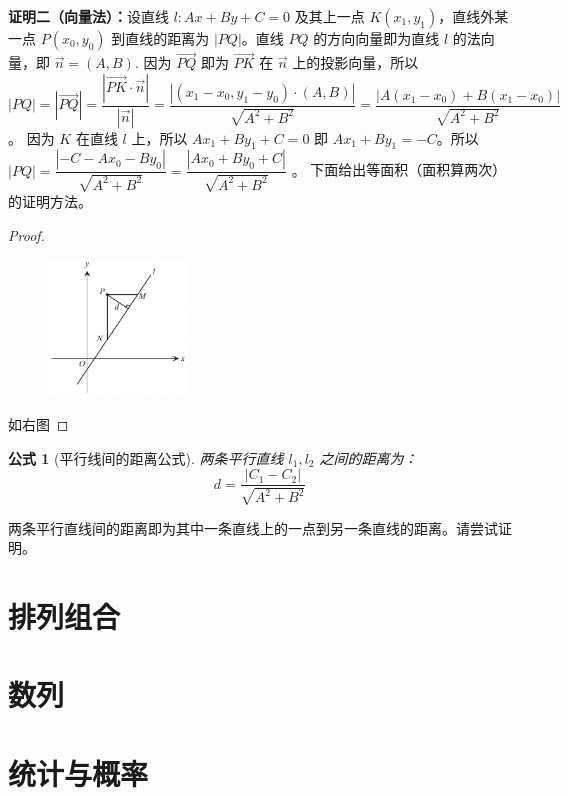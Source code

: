 \documentclass[a4paper,openany]{ctexbook}
\newtheorem{formula}{公式}
\renewcommand{\vec}{\overrightarrow}
\begin{document}
{    \textbf{证明二（向量法）：}设直线 \(l:Ax + By + C = 0\) 及其上一点 \(K(x_1,y_1)\)，直线外某一点 \(P(x_0,y_0)\) 到直线的距离为 \(|PQ|\)。直线 \(PQ\) 的方向向量即为直线 \(l\) 的法向量，即 \(\vec{n} =(A,B)\).
    因为 \(\vec{PQ}\) 即为 \(\vec{PK}\) 在 \(\vec{n}\) 上的投影向量，所以
    \(|PQ|=|\vec{PQ}|= \dfrac{|\vec{PK}\cdot \vec{n}|}{|\vec{n}|} = \dfrac{|(x_1 - x_0,y_1 - y_0)\cdot (A,B)|}{\sqrt{A^2 + B^2}} = \dfrac{|A(x_1 - x_0) + B(x_1 - x_0)|}{\sqrt{A^2 + B^2}} \)。
    因为 \(K\) 在直线 \(l\) 上，所以 \(Ax_1 + By_1 + C = 0\) 即 \(Ax_1 + By_1 =- C\)。所以 \(|PQ|= \dfrac{|- C - Ax_0 - By_0|}{\sqrt{A^2 + B^2}} =\dfrac{|Ax_0 + By_0 + C|}{\sqrt{A^2 + B^2}}\) 。
}%
下面给出等面积（面积算两次）的证明方法。

\begin{proof}
    \begin{figure}
        \centering
        \includegraphics[width=10em]{image35.png}
    \end{figure}
    如右图
\end{proof}

\begin{formula}[平行线间的距离公式]
    两条平行直线 \(l_1,l_2\) 之间的距离为：
    \[
        d = \dfrac{|C_1 - C_2|}{\sqrt{A^2 + B^2}}
    \]
\end{formula}

两条平行直线间的距离即为其中一条直线上的一点到另一条直线的距离。请尝试证明。%

\chapter{排列组合}

\chapter{数列}

\chapter{统计与概率}
\end{document}
